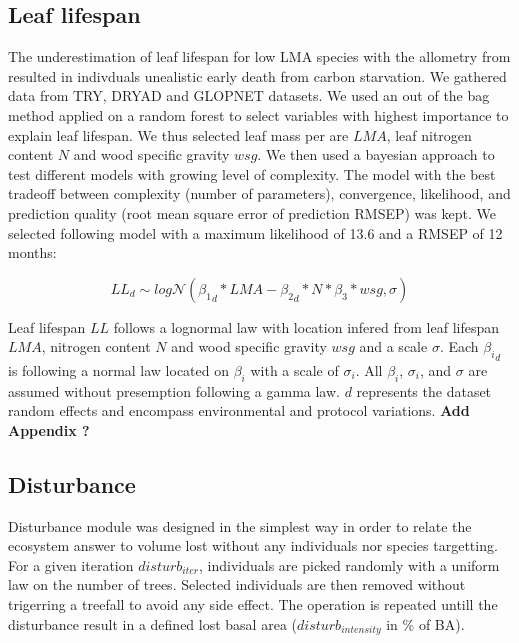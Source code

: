 \documentclass[12pt,]{article}
\theoremstyle{definition}
\theoremstyle{definition}
\theoremstyle{remark}
\begin{document}
\subsection{Leaf lifespan}\label{leaf-lifespan}

The underestimation of leaf lifespan for low LMA species with the
allometry from \citet{Reich1991a} resulted in indivduals unealistic
early death from carbon starvation. We gathered data from
TRY\citep{Kattge2011}, DRYAD \citep{chave_towards_2009} and GLOPNET
\citep{wright_worldwide_2004} datasets. We used an out of the bag method
applied on a random forest to select variables with highest importance
to explain leaf lifespan. We thus selected leaf mass per are \(LMA\),
leaf nitrogen content \(N\) and wood specific gravity \(wsg\). We then
used a bayesian approach to test different models with growing level of
complexity. The model with the best tradeoff between complexity (number
of parameters), convergence, likelihood, and prediction quality (root
mean square error of prediction RMSEP) was kept. We selected following
model with a maximum likelihood of 13.6 and a RMSEP of 12 months:

\begin{equation}
  LL_{d} \sim log\mathcal{N}({\beta_1}_d*LMA - {\beta_2}_d*N*\beta_3*wsg, \sigma)
  \label{eq:LL}
\end{equation}

Leaf lifespan \(LL\) follows a lognormal law with location infered from
leaf lifespan \(LMA\), nitrogen content \(N\) and wood specific gravity
\(wsg\) and a scale \(\sigma\). Each \({\beta_i}_d\) is following a
normal law located on \(\beta_i\) with a scale of \(\sigma_i\). All
\(\beta_i\), \(\sigma_i\), and \(\sigma\) are assumed without
presemption following a gamma law. \(d\) represents the dataset random
effects and encompass environmental and protocol variations. \textbf{Add
Appendix ?}

\subsection{Disturbance}\label{disturbance}

Disturbance module was designed in the simplest way in order to relate
the ecosystem answer to volume lost without any individuals nor species
targetting. For a given iteration \(disturb_{iter}\), individuals are
picked randomly with a uniform law on the number of trees. Selected
individuals are then removed without trigerring a treefall to avoid any
side effect. The operation is repeated untill the disturbance result in
a defined lost basal area (\(disturb_{intensity}\) in \% of BA).
\end{document}
